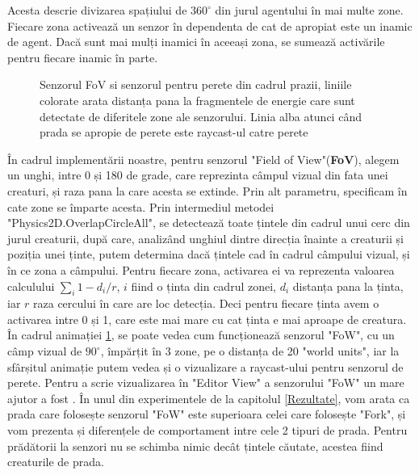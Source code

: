 Acesta descrie divizarea spațiului de $360^{\circ}$ din jurul agentului în mai multe zone. Fiecare zona activează un senzor în dependenta de cat de apropiat este un inamic de agent. Dacă sunt mai mulți inamici în aceeași zona, se sumează activările pentru fiecare inamic în parte.
\begin{figure}[h]
	\centering
	\caption{Senzorul FoV si senzorul pentru perete din cadrul prazii, liniile colorate arata distanța pana la fragmentele de energie care sunt detectate de diferitele zone ale senzorului. Linia alba atunci când prada se apropie de perete este raycast-ul catre perete}
    \label{fig:senzorDemo}
\end{figure}

În cadrul implementării noastre, pentru senzorul "Field of View"(\textbf{FoV}), alegem un unghi, intre 0 și 180 de grade, care reprezinta câmpul vizual din fata unei creaturi, și raza pana la care acesta se extinde.
Prin alt parametru, specificam în cate zone se împarte acesta. 
Prin intermediul metodei "Physics2D.OverlapCircleAll", se detectează toate țintele din cadrul unui cerc din jurul creaturii, după care, analizând unghiul dintre direcția înainte a creaturii și poziția unei ținte, putem determina dacă țintele cad în cadrul câmpului vizual, și în ce zona a câmpului.
Pentru fiecare zona, activarea ei va reprezenta valoarea calculului $\sum_{i} 1 - d_i/r$, $i$ fiind o ținta din cadrul zonei, $d_i$ distanța pana la ținta, iar $r$ raza cercului în care are loc detecția. Deci pentru fiecare ținta avem o activarea intre 0 și 1, care este mai mare cu cat ținta e mai aproape de creatura.
În cadrul animației \ref{fig:senzorDemo}, se poate vedea cum funcționează senzorul "FoW", cu un câmp vizual de $90^{\circ}$, împărțit în 3 zone, pe o distanța de 20 "world units", iar la sfârșitul animație putem vedea și o vizualizare a raycast-ului pentru senzorul de perete.
Pentru a scrie vizualizarea în "Editor View" a senzorului "FoW" un mare ajutor a fost \cite{FoWVisualization}.
În unul din experimentele de la capitolul \ref{Rezultate}, vom arata ca prada care folosește senzorul "FoW" este superioara celei care folosește "Fork", și vom prezenta și diferențele de comportament intre cele 2 tipuri de prada.
Pentru prădătorii la senzori nu se schimba nimic decât țintele căutate, acestea fiind creaturile de prada.

